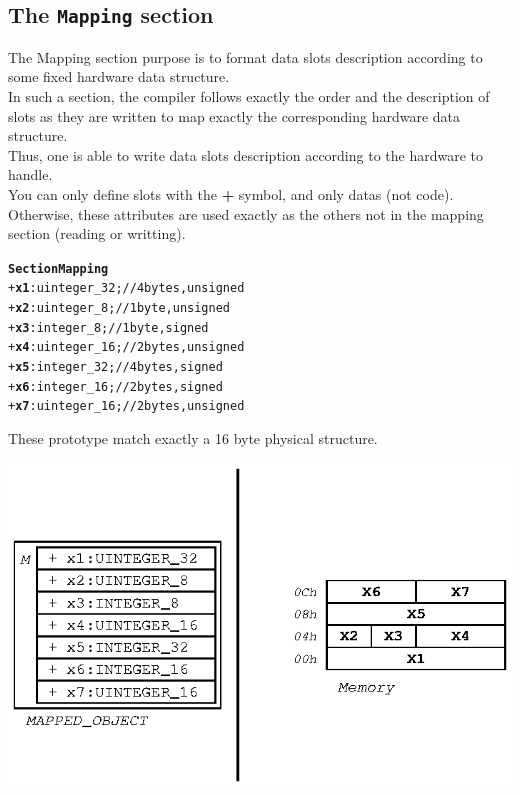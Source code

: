 \documentclass[11pt]{mybook}
\begin{document}
\subsection{The {\tt{}Mapping} section }
\label{language_reference:section_identifiers:mapping_section}
The Mapping section purpose is to format data slots description according to some fixed hardware data structure. \\
In such a section, the compiler follows exactly the order and the description of slots as they are written to map exactly the
corresponding hardware data structure.\\
Thus, one is able to write data slots description according to the hardware to handle.\\
You can only define slots with the {\bf{} +} symbol, and only datas (not code).\\
Otherwise, these attributes are used exactly as the others not in the mapping section (reading or writting).
\begin{alltt}
{\bf{}Section Mapping}
  + {\bf{}x1}:{\sc{}uinteger\_32};   // 4 bytes, unsigned
  + {\bf{}x2}:{\sc{}uinteger\_8};    // 1 byte,  unsigned
  + {\bf{}x3}:{\sc{}integer\_8};     // 1 byte,  signed
  + {\bf{}x4}:{\sc{}uinteger\_16};   // 2 bytes, unsigned
  + {\bf{}x5}:{\sc{}integer\_32};    // 4 bytes, signed
  + {\bf{}x6}:{\sc{}integer\_16};    // 2 bytes, signed 
  + {\bf{}x7}:{\sc{}uinteger\_16};   // 2 bytes, unsigned
\end{alltt}
These prototype match exactly a 16 byte physical structure.
\begin{center}
\includegraphics[scale=1.0]{figures/mapping}
\end{center}
\end{document}
